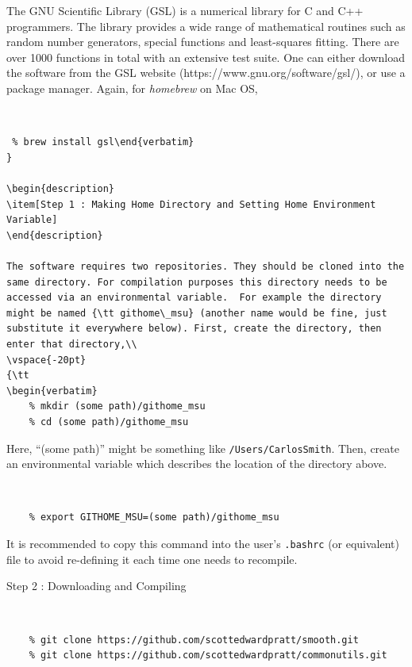 \documentclass[12pt]{article}
\numberwithin{equation}{section}
\numberwithin{figure}{section}
\begin{document}
The GNU Scientific Library (GSL) is a numerical library for C and C++ programmers. The library provides a wide range of mathematical routines such as random number generators, special functions and least-squares fitting. There are over 1000 functions in total with an extensive test suite. One can either download the software from the GSL website (https://www.gnu.org/software/gsl/), or use a package manager. Again, for {\it homebrew} on Mac OS,\\
\vspace{-20pt}
{\tt 
\begin{verbatim} % brew install gsl\end{verbatim}
}

\begin{description}
\item[Step 1 : Making Home Directory and Setting Home Environment Variable]
\end{description}

The software requires two repositories. They should be cloned into the same directory. For compilation purposes this directory needs to be accessed via an environmental variable.  For example the directory might be named {\tt githome\_msu} (another name would be fine, just substitute it everywhere below). First, create the directory, then enter that directory,\\
\vspace{-20pt}
{\tt 
\begin{verbatim}
    % mkdir (some path)/githome_msu
    % cd (some path)/githome_msu
\end{verbatim}
}
Here, ``(some path)'' might be something like {\tt /Users/CarlosSmith}. Then, create an environmental variable which describes the location of the directory above.\\
\vspace{-20pt}
{\tt 
\begin{verbatim}
    % export GITHOME_MSU=(some path)/githome_msu
\end{verbatim}
}
It is recommended to copy this command into the user's {\tt .bashrc} (or equivalent) file to avoid re-defining it each time one needs to recompile.

\begin{description}
\item[Step 2 : Downloading and Compiling] 
\end{description}
\vspace{-20pt}
{\tt 
\begin{verbatim}
    % git clone https://github.com/scottedwardpratt/smooth.git
    % git clone https://github.com/scottedwardpratt/commonutils.git
\end{verbatim}
}
\end{document}
